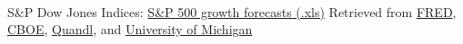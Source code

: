 \documentclass{report}
\newcommand{\cf}[2][]{\indent \color{black!90} \scriptsize{{#1} \hfill {#2}}}
\begin{document}
		 \\
		\cf[S\&P Dow Jones Indices:
			\href{https://us.spindices.com/documents/additional-material/sp-500-eps-est.xlsx}
			{S\&P 500 growth forecasts (.xls)}]
				{Retrieved from \href{https://fred.stlouisfed.org/}{FRED}, 
				\href{http://www.cboe.com}{CBOE}, \href{https://www.quandl.com}{Quandl}, and 
				\href{http://www.sca.isr.umich.edu/}{University of Michigan}}
\end{document}
